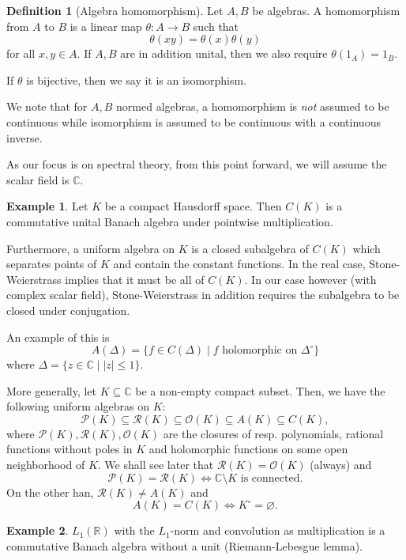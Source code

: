 \documentclass[]{article}
\theoremstyle{definition}
\newtheorem{definition}{Definition}[section]
\newtheorem{example}{Example}[section]
\begin{document}
\begin{definition}[Algebra homomorphism]
  Let \(A, B\) be algebras. A homomorphism from \(A\) to \(B\) is a linear map \(\theta : A \to B\) 
  such that 
  \[\theta(xy) = \theta(x) \theta(y)\]
  for all \(x, y \in A\).
  If \(A, B\) are in addition unital, then we also require \(\theta(1_A) = 1_B\).

  If \(\theta\) is bijective, then we say it is an isomorphism.
\end{definition}

We note that for \(A, B\) normed algebras, a homomorphism is \textit{not} assumed to be continuous 
while isomorphism is assumed to be continuous with a continuous inverse.

As our focus is on spectral theory, from this point forward, we will assume the scalar field is \(\mathbb{C}\).

\begin{example} 
  Let \(K\) be a compact Hausdorff space. Then \(C(K)\) is a commutative unital Banach algebra under 
  pointwise multiplication.

  Furthermore, a uniform algebra on \(K\) is a closed subalgebra of \(C(K)\) which separates points 
  of \(K\) and contain the constant functions. In the real case, Stone-Weierstrass implies that 
  it must be all of \(C(K)\). In our case however (with complex scalar field), Stone-Weierstrass in 
  addition requires the subalgebra to be closed under conjugation.

  An example of this is 
  \[A(\Delta) = \{f \in C(\Delta) \mid f \text{ holomorphic on } \Delta^\circ\}\]
  where \(\Delta = \{z \in \mathbb{C} \mid |z| \le 1\}.\)

  More generally, let \(K \subseteq \mathbb{C}\) be a non-empty compact subset. Then, we have the 
  following uniform algebras on \(K\):
  \[\mathcal{P}(K) \subseteq \mathcal{R}(K) \subseteq \mathcal{O}(K) \subseteq A(K) \subseteq C(K),\]
  where \(\mathcal{P}(K), \mathcal{R}(K), \mathcal{O}(K)\) are the closures of resp. 
  polynomials, rational functions without poles in \(K\) and holomorphic functions on some 
  open neighborhood of \(K\). We shall see later that \(\mathcal{R}(K) = \mathcal{O}(K)\) (always) and 
  \[\mathcal{P}(K) = \mathcal{R}(K) \iff \mathbb{C} \setminus K \text{ is connected.}\]
  On the other han, \(\mathcal{R}(K) \neq A(K)\) and 
  \[A(K) = C(K) \iff K^\circ = \varnothing.\]
\end{example}

\begin{example}
  \(L_1(\mathbb{R})\) with the \(L_1\)-norm and convolution as multiplication is a commutative 
  Banach algebra without a unit (Riemann-Lebesgue lemma).
\end{example}
\end{document}
